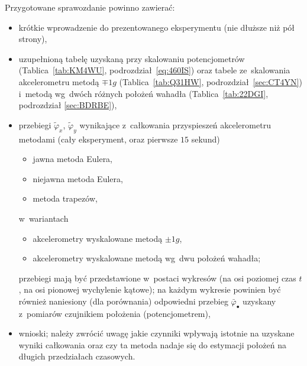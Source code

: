 \documentclass[paper=a4,DIV=12]{lpas}
\begin{document}
Przygotowane sprawozdanie powinno zawierać:
\begin{itemize}
  \item krótkie wprowadzenie do prezentowanego eksperymentu (nie dłuższe niż
    pół strony),
  \item uzupełnioną tabelę uzyskaną przy skalowaniu potencjometrów
    (Tablica~\ref{tab:KM4WU}, podrozdział~\ref{eq:460IS}) oraz tabele
    ze~skalowania akcelerometru metodą $\mp 1g$ (Tablica~\ref{tab:Q31HW},
    podrozdział~\ref{sec:CT4YN}) i~metodą wg~dwóch różnych położeń wahadła
    (Tablica~\ref{tab:22DGI}, podrozdział \ref{sec:BDRBE}),
  \item przebiegi $\tilde{\varphi}_x$, $\tilde{\varphi}_y$ wynikające
    z~całkowania przyspieszeń akcelerometru metodami (cały eksperyment, oraz
    pierwsze $15$ sekund)
    \begin{itemize}
      \item jawna metoda Eulera,
      \item niejawna metoda Eulera,
      \item metoda trapezów,
    \end{itemize}
    w~wariantach
    \begin{itemize}
      \item akcelerometry wyskalowane metodą $\pm 1g$,
      \item akcelerometry wyskalowane metodą wg~dwu położeń wahadła;
    \end{itemize}
    przebiegi mają być przedstawione w~postaci wykresów (na osi poziomej czas
    $t$, na osi pionowej wychylenie kątowe); na każdym wykresie powinien być
    również naniesiony (dla porównania) odpowiedni przebieg
    $\bar{\varphi}_{\bullet}$ uzyskany z~pomiarów czujnikiem położenia
    (potencjometrem),
  \item wnioski; należy zwrócić uwagę jakie czynniki wpływają istotnie na
    uzyskane wyniki całkowania oraz czy ta metoda nadaje się do estymacji
    położeń na długich przedziałach czasowych.
\end{itemize}
\end{document}

